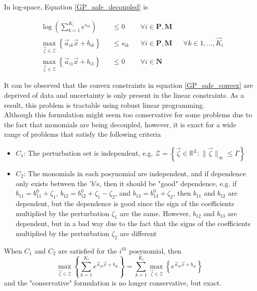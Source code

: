 In log-space, Equation \eqref{GP_safe_decoupled} is

\begin{equation}
\begin{aligned}
&\log(\textstyle{\sum}_{k=1}^{K_i}e^{s_{ik}}) &&\leq 0 &&\forall i \in \mathbf{P},\mathbf{M} \\
&\max_{\vec{\zeta} \in \mathcal{Z}} \left\{\vec{a}_{ik}\vec{x} + b_{ik}\right\} &&\leq s_{ik} &&\forall i \in \mathbf{P},\mathbf{M} &&\forall k \in 1,...,\vec{K}_i\\
&\max_{\vec{\zeta} \in \mathcal{Z}} \left\{\vec{a}_{i1}\vec{x} + b_{i1}\right\} &&\leq 0 &&\forall i \in \mathbf{N}
\end{aligned}
\label{GP_safe_convex}
\end{equation}

It can be observed that the convex constraints in equation \eqref{GP_safe_convex}
are deprived of data and uncertainty is only present in the linear constraints.
As a result, this problem is tractable using robust linear programming.\\[12pt]
Although this formulation might seem too conservative for some problems due to the fact that monomials are being decoupled,
however, it is exact for a wide range of problems that satisfy the following criteria
\begin{itemize}
\item $C_1$: The perturbation set is independent, e.g. $\mathcal{Z} = \left\{ \vec{\zeta} \in \mathbb{R}^L: \|\vec{\zeta}\|_{\infty} \leq \Gamma\right\}$
\item $C_2$: The monomials in each posynomial are independent, and if dependence only exists between the $'b'$s, then it should be "good" dependence, e.g. if $b_{11} = b_{11}^0 + \zeta_1$, $b_{12} = b_{12}^0 + \zeta_1 - \zeta_2$, and $b_{13} = b_{13}^0 + \zeta_2$, then $b_{11}$ and $b_{12}$ are dependent, but the dependence is good since the sign of the coefficients multiplied by the perturbation $\zeta_1$ are the same. However, $b_{12}$ and $b_{13}$ are dependent, but in a bad way due to the fact that the signs of the coefficients multiplied by the perturbation $\zeta_2$ are different
\end{itemize}
When $C_1$ and $C_2$ are satisfied for the $i^{th}$ posynomial, then
$$
\max_{\vec{\zeta} \in \mathcal{Z}} \left\{\textstyle{\sum}_{k=1}^{K_i}e^{\vec{a}_{ik}\vec{x} + b_{ik}}\right\} = \sum_{k=1}^{K_i}\max_{\vec{\zeta} \in \mathcal{Z}} \left\{e^{\vec{a}_{ik}\vec{x} + b_{ik}}\right\}
$$
and the "conservative" formulation is no longer conservative, but exact.\\

